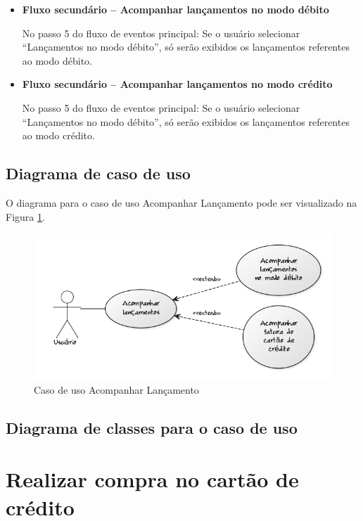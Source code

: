 \begin{itemize}
  \item \textbf{Fluxo secundário – Acompanhar lançamentos no modo débito}

  No passo 5 do fluxo de eventos principal:
  \subitem Se o usuário selecionar ``Lançamentos no modo débito'', só serão exibidos os lançamentos referentes ao modo débito.

  \item \textbf{Fluxo secundário – Acompanhar lançamentos no modo crédito}

  No passo 5 do fluxo de eventos principal:
  \subitem Se o usuário selecionar ``Lançamentos no modo débito'', só serão exibidos os lançamentos referentes ao modo crédito.
\end{itemize}

\subsection{Diagrama de caso de uso}

O diagrama para o caso de uso Acompanhar Lançamento pode ser visualizado na Figura \ref{cdu:acompanharLancamento}.

\begin{figure}[!htb]
     \centering
     \includegraphics[scale=0.6]{diagramas/caso-de-uso/imagens/acompanharLancamento.png}
     \caption{Caso de uso Acompanhar Lançamento}
     \label{cdu:acompanharLancamento}
\end{figure}

\subsection{Diagrama de classes para o caso de uso}

\section{Realizar compra no cartão de crédito}

